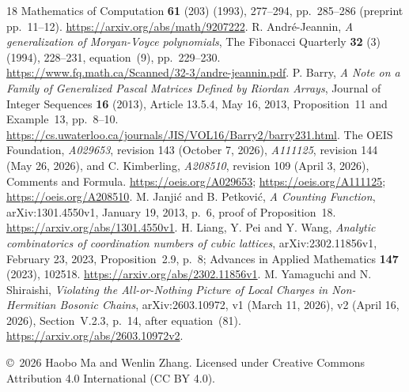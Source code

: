 \documentclass[11pt]{article}
\begin{document}
\begin{thebibliography}{18}
Mathematics of Computation \textbf{61} (203) (1993), 277--294,
pp.~285--286 (preprint pp.~11--12).
\url{https://arxiv.org/abs/math/9207222}.
R. Andr\'e-Jeannin, \emph{A generalization of Morgan-Voyce polynomials},
The Fibonacci Quarterly \textbf{32} (3) (1994), 228--231,
equation~(9), pp.~229--230.
\url{https://www.fq.math.ca/Scanned/32-3/andre-jeannin.pdf}.
P. Barry, \emph{A Note on a Family of Generalized Pascal Matrices Defined
by Riordan Arrays}, Journal of Integer Sequences \textbf{16} (2013),
Article 13.5.4, May 16, 2013, Proposition~11 and Example~13, pp.~8--10.
\url{https://cs.uwaterloo.ca/journals/JIS/VOL16/Barry2/barry231.html}.
The OEIS Foundation, \emph{A029653}, revision 143 (October 7, 2026),
\emph{A111125}, revision 144 (May 26, 2026), and
C. Kimberling, \emph{A208510}, revision 109 (April 3, 2026),
Comments and Formula.
\url{https://oeis.org/A029653}; \url{https://oeis.org/A111125};
\url{https://oeis.org/A208510}.
M. Janji\'c and B. Petkovi\'c, \emph{A Counting Function},
arXiv:1301.4550v1, January 19, 2013, p.~6, proof of Proposition~18.
\url{https://arxiv.org/abs/1301.4550v1}.
H. Liang, Y. Pei and Y. Wang, \emph{Analytic combinatorics of coordination
numbers of cubic lattices}, arXiv:2302.11856v1, February 23, 2023,
Proposition~2.9, p.~8; Advances in Applied Mathematics \textbf{147} (2023),
102518. \url{https://arxiv.org/abs/2302.11856v1}.
M. Yamaguchi and N. Shiraishi, \emph{Violating the All-or-Nothing Picture
of Local Charges in Non-Hermitian Bosonic Chains}, arXiv:2603.10972,
v1 (March 11, 2026), v2 (April 16, 2026), Section~V.2.3, p.~14,
after equation~(81). \url{https://arxiv.org/abs/2603.10972v2}.
\end{thebibliography}
\noindent\small\copyright\ 2026 Haobo Ma and Wenlin Zhang.
Licensed under Creative Commons Attribution 4.0 International (CC BY 4.0).
\end{document}
